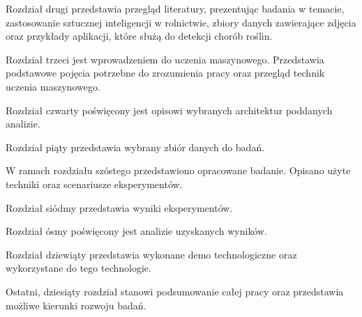 Rozdział drugi przedstawia przegląd literatury, prezentując badania w temacie, zastosowanie sztucznej inteligencji w rolnictwie, zbiory danych zawierające zdjęcia oraz przykłady aplikacji, które służą do detekcji chorób roślin.

Rozdział trzeci jest wprowadzeniem do uczenia maszynowego. Przedstawia podstawowe pojęcia potrzebne do zrozumienia pracy oraz przegląd technik uczenia maszynowego.

Rozdział czwarty poświęcony jest opisowi wybranych architektur poddanych analizie. 

Rozdział piąty przedstawia wybrany zbiór danych do badań.

W ramach rozdziału szóstego przedstawiono opracowane badanie. Opisano użyte techniki oraz scenariusze eksperymentów. 

Rozdział siódmy przedstawia wyniki eksperymentów.

Rozdział ósmy poświęcony jest analizie uzyskanych wyników.

Rozdział dziewiąty przedstawia wykonane demo technologiczne oraz wykorzystane do tego technologie.

Ostatni, dziesiąty rozdział stanowi podsumowanie całej pracy oraz przedstawia możliwe kierunki rozwoju badań.
\clearpage